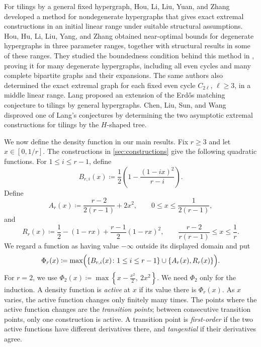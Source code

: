 \documentclass[10pt]{article}
\numberwithin{equation}{section}
\begin{document}
For tilings by a general fixed hypergraph, Hou, Li, Liu, Yuan, and Zhang \cite{HLLYZ25} developed a method for nondegenerate hypergraphs that gives exact extremal constructions in an initial linear range under suitable structural assumptions.  Hou, Hu, Li, Liu, Yang, and Zhang \cite{HHLLYZ25Degenerate} obtained near-optimal bounds for degenerate hypergraphs in three parameter ranges, together with structural results in some of these ranges.  They studied the boundedness condition behind this method in \cite{HHLLYZ26Boundedness}, proving it for many degenerate hypergraphs, including all even cycles and many complete bipartite graphs and their expansions.  The same authors \cite{HHLLYZ26EvenCycles} also determined the exact extremal graph for each fixed even cycle $C_{2\ell}$, $\ell\ge3$, in a middle linear range.  Lang \cite{Lang23} proposed an extension of the Erd\H{o}s matching conjecture to tilings by general hypergraphs.  Chen, Liu, Sun, and Wang \cite{CLSW25} disproved one of Lang's conjectures by determining the two asymptotic extremal constructions for tilings by the $H$-shaped tree.

We now define the density function in our main results.  Fix $r\ge3$ and let $x\in[0,1/r]$.  The constructions in \cref{sec:constructions} give the following quadratic functions.  For $1\le i\le r-1$, define
\begin{equation}\label{eq:B}
 B_{r,i}(x)
 \coloneqq\frac12\left(1-\frac{(1-ix)^2}{r-i}\right).
\end{equation}
Define
\begin{equation}\label{eq:A}
 A_r(x)\coloneqq\frac{r-2}{2(r-1)}+2x^2,
 \qquad 0\le x\le\frac1{2(r-1)},
\end{equation}
and
\begin{equation}\label{eq:R}
 R_r(x)\coloneqq\frac12-(1-rx)+\frac{r-1}{2}(1-rx)^2,
 \qquad \frac{r-2}{r(r-1)}\le x\le\frac1r.
\end{equation}
We regard a function as having value $-\infty$ outside its displayed domain and put
\begin{equation}\label{eq:Phi}
 \Phi_r(x)\coloneqq\max\Bigl(\{B_{r,i}(x)\colon 1\le i\le r-1\}\cup\{A_r(x),R_r(x)\}\Bigr).
\end{equation}
For $r=2$, we use $ \Phi_2(x)\coloneqq\max\left\{x-\frac{x^2}{2},~2x^2\right\}$. 
We need $\Phi_2$ only for the induction.  A density function is \emph{active} at $x$ if its value there is $\Phi_r(x)$.  As $x$ varies, the active function changes only finitely many times.  The points where the active function changes are the \emph{transition points}; between consecutive transition points, only one construction is active.  A transition point is \emph{first-order} if the two active functions have different derivatives there, and \emph{tangential} if their derivatives agree.
\end{document}
